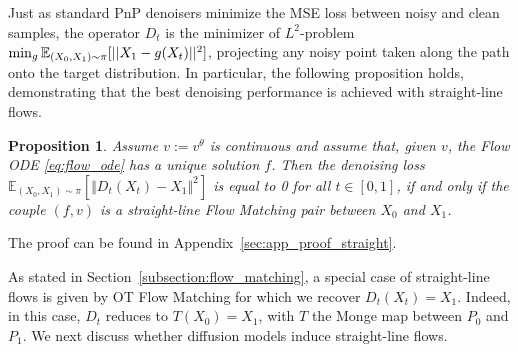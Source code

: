 \documentclass{article} %
\newtheorem{proposition}[theorem]{Proposition}
\theoremstyle{definition}
\begin{document}
Just as standard PnP denoisers minimize the MSE loss between noisy and clean samples, the operator $D_t$ is the minimizer of $L^2$-problem $\min_{g} \mathbb{E}_{(X_0, X_1) \sim \pi} [||X_1 -g(X_t)||^2]$, projecting any noisy point taken along the path onto the target distribution. 
In particular, the following proposition holds, demonstrating that the best denoising performance is achieved with straight-line flows.
%
\begin{proposition}\label{prop:straight}
Assume $v:=v^\theta$ is continuous and assume that, given $v$, the Flow ODE \eqref{eq:flow_ode} has a unique solution $f$.
Then the denoising loss $\mathbb{E}_{(X_0,X_1) \sim \pi}[\Vert D_t(X_t) -X_1 \Vert^2]$ is equal to 0 for all $t \in [0,1]$, if and only if the couple $(f, v)$ is a straight-line Flow Matching pair between $X_0$ and $X_1$.
\end{proposition}

The proof can be found in Appendix~\ref{sec:app_proof_straight}.

As stated in Section~\ref{subsection:flow_matching}, a special case of straight-line flows is given by OT Flow Matching for which we recover $D_t(X_t) = X_1$. Indeed, in this case, $D_t$ reduces to $T(X_0) = X_1$, with $T$ the Monge map between $P_0$ and $P_1$.
%
%
We next discuss whether diffusion models induce straight-line flows.
\end{document}
